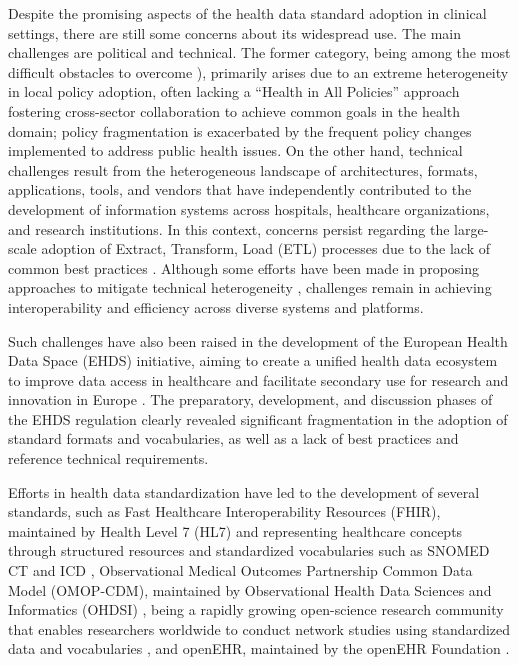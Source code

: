 Despite the promising aspects of the health data standard adoption in clinical settings, there are still some concerns about its widespread use. The main challenges are political and technical. The former category, being among the most difficult obstacles to overcome \cite{shankardass_implementation_2018}), primarily arises due to an extreme heterogeneity in local policy adoption, often lacking a ``Health in All Policies'' approach \cite{noauthor_health_2006} fostering cross-sector collaboration to achieve common goals in the health domain; policy fragmentation is exacerbated by the frequent policy changes implemented to address public health issues. On the other hand, technical challenges result from the heterogeneous landscape of architectures, formats, applications, tools, and vendors that have independently contributed to the development of information systems across hospitals, healthcare organizations, and research institutions. In this context, concerns persist regarding the large-scale adoption of Extract, Transform, Load (ETL) processes due to the lack of common best practices \cite{pollack_porter_importance_2018}. Although some efforts have been made in proposing approaches to mitigate technical heterogeneity \cite{marfoglia_towards_2025,arcobelli_motu_2023,bennett2023mimic,williams2023standardized}, challenges remain in achieving interoperability and efficiency across diverse systems and platforms.

Such challenges have also been raised in the development of the European Health Data Space (EHDS) initiative, aiming to create a unified health data ecosystem to improve data access in healthcare and facilitate secondary use for research and innovation in Europe \cite{noauthor_european_2025}. The preparatory, development, and discussion phases of the EHDS regulation clearly revealed significant fragmentation in the adoption of standard formats and vocabularies, as well as a lack of best practices and reference technical requirements.

Efforts in health data standardization have led to the development of several standards, such as Fast Healthcare Interoperability Resources (FHIR), maintained by Health Level 7 (HL7) \cite{noauthor_index_fhir} and representing healthcare concepts through structured resources and standardized vocabularies such as SNOMED CT and ICD \cite{arcobelli2024fhir}, Observational Medical Outcomes Partnership Common Data Model (OMOP-CDM), maintained by Observational Health Data Sciences and Informatics (OHDSI) \cite{reinecke_usage_2021}, being a rapidly growing open-science research community that enables researchers worldwide to conduct network studies using standardized data and vocabularies \cite{reinecke_usage_2021}, and openEHR, maintained by the openEHR Foundation \cite{kalra_openehr_2005}.

